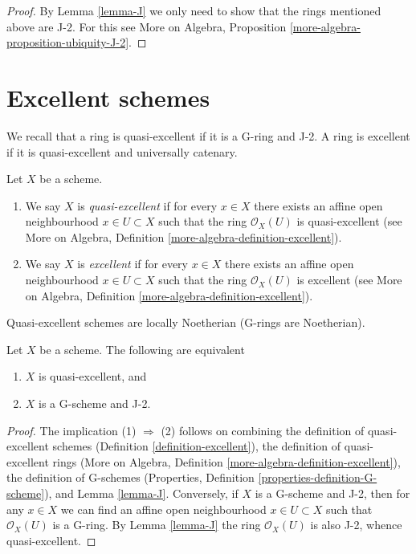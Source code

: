 \begin{proof}
By Lemma \ref{lemma-J} we only need to show that
the rings mentioned above are J-2. For this see
More on Algebra, Proposition \ref{more-algebra-proposition-ubiquity-J-2}.
\end{proof}




\section{Excellent schemes}
\label{section-excellent}

\noindent
We recall that a ring is quasi-excellent if it is a G-ring and J-2.
A ring is excellent if it is quasi-excellent and universally catenary.

\begin{definition}
\label{definition-excellent}
Let $X$ be a scheme.
\begin{enumerate}
\item We say $X$ is {\it quasi-excellent} if for every $x \in X$ there exists
an affine open neighbourhood $x \in U \subset X$ such that the ring
$\mathcal{O}_X(U)$ is quasi-excellent (see
More on Algebra, Definition \ref{more-algebra-definition-excellent}).
\item We say $X$ is {\it excellent} if for every $x \in X$ there exists an
affine open neighbourhood $x \in U \subset X$ such that the ring
$\mathcal{O}_X(U)$ is excellent (see
More on Algebra, Definition \ref{more-algebra-definition-excellent}).
\end{enumerate}
\end{definition}

\noindent
Quasi-excellent schemes are locally Noetherian (G-rings are Noetherian).

\begin{lemma}
\label{lemma-characterize-quasi-excellent}
Let $X$ be a scheme. The following are equivalent
\begin{enumerate}
\item $X$ is quasi-excellent, and
\item $X$ is a G-scheme and J-2.
\end{enumerate}
\end{lemma}

\begin{proof}
The implication (1) $\Rightarrow$ (2) follows on combining
the definition of quasi-excellent schemes
(Definition \ref{definition-excellent}),
the definition of quasi-excellent rings
(More on Algebra, Definition \ref{more-algebra-definition-excellent}),
the definition of G-schemes
(Properties, Definition \ref{properties-definition-G-scheme}), and
Lemma \ref{lemma-J}.
Conversely, if $X$ is a G-scheme and J-2, then for any $x \in X$
we can find an affine open neighbourhood $x \in U \subset X$
such that $\mathcal{O}_X(U)$ is a G-ring. By Lemma \ref{lemma-J}
the ring $\mathcal{O}_X(U)$ is also J-2, whence quasi-excellent.
\end{proof}

